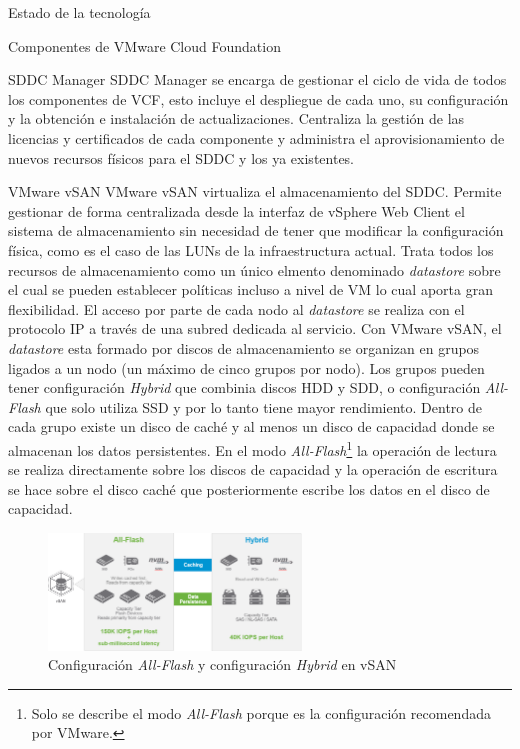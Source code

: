 \begin{section}{Estado de la tecnología}
\begin{subsection}{Componentes de VMware Cloud Foundation \cite{componentesCloudFound}}
\begin{subsubsection}{SDDC Manager}
    SDDC Manager se encarga de gestionar el ciclo de vida de todos los componentes de VCF, esto incluye el despliegue de cada uno, su configuración y la obtención e instalación de actualizaciones. Centraliza la gestión de las licencias y certificados de cada componente y administra el aprovisionamiento de nuevos recursos físicos para el SDDC y los ya existentes.
\end{subsubsection}
\begin{subsubsection}{VMware vSAN}
    VMware vSAN virtualiza el almacenamiento del SDDC. Permite gestionar de forma centralizada desde la interfaz de vSphere Web Client el sistema de almacenamiento sin necesidad de tener que modificar la configuración física, como es el caso de las LUNs de la infraestructura actual. Trata todos los recursos de almacenamiento como un único elmento denominado \textit{datastore} sobre el cual se pueden establecer políticas incluso a nivel de VM lo cual aporta gran flexibilidad. El acceso por parte de cada nodo al \textit{datastore} se realiza con el protocolo IP a través de una subred dedicada al servicio. Con VMware vSAN, el \textit{datastore} esta formado por discos de almacenamiento se organizan en grupos ligados a un nodo (un máximo de cinco grupos por nodo). Los grupos pueden tener configuración \textit{Hybrid} que combinia discos HDD y SDD, o configuración \textit{All-Flash} que solo utiliza SSD y por lo tanto tiene mayor rendimiento. Dentro de cada grupo existe un disco de caché y al menos un disco de capacidad donde se almacenan los datos persistentes\cite{operacionesVSAN}. En el modo \textit{All-Flash}\footnote{Solo se describe el modo \textit{All-Flash} porque es la configuración recomendada por VMware.} la operación de lectura se realiza directamente sobre los discos de capacidad y la operación de escritura se hace sobre el disco caché que posteriormente escribe los datos en el disco de capacidad.
    \begin{figure}[h!]
    \centering
        \includegraphics[width=0.6\textwidth]{imaxes/cap2recursos/rendimientoVSAN.png}
        \caption{Configuración \textit{All-Flash} y configuración \textit{Hybrid} en vSAN}
        \label{fig:performance-Hybrid-AllFlash-vSAN}
    \end{figure}
    \FloatBarrier
\end{subsubsection}


\end{subsection}
\end{section}
